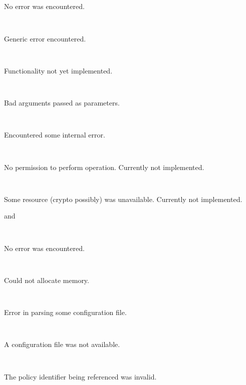 \begin{description}

\item {}\verb" "

\begin{description}

\item {}\verb" "

No error was encountered.

\item {}\verb" "

Generic error encountered.

\item {}\verb" "

Functionality not yet implemented.

\item {}\verb" "

Bad arguments passed as parameters.

\item {}\verb" "

Encountered some internal error.

\item {}\verb" "

No permission to perform operation.  Currently not implemented.

\item {}\verb" "

Some resource (crypto possibly) was unavailable.  Currently not implemented.

\end{description}

\item {} and
\verb" "

\begin{description}

\item {}\verb" "

No error was encountered.

\item {}\verb" "

Could not allocate memory.

\item {}\verb" "

Error in parsing some configuration file.

\item {}\verb" "

A configuration file was not available.

\item {}\verb" "

The policy identifier being referenced was invalid.

\end{description}

\end{description}

